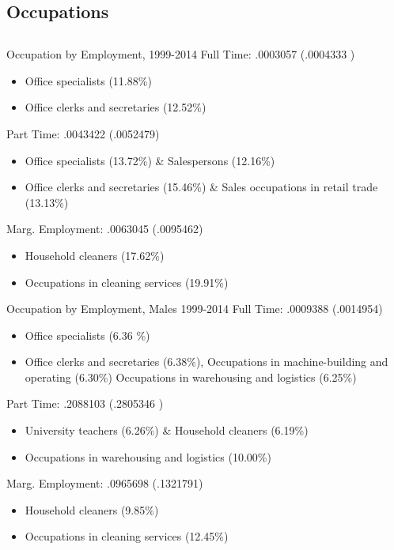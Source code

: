 \documentclass[hyperref={bookmarks=false}]{beamer}
\begin{document}
\begin{appendix}
\section{Occupations}
\subsection{}

\begin{frame}
\label{OCCUP}
\end{frame}

\begin{frame}{Occupation by Employment, 1999-2014}
Full Time: .0003057 (.0004333 )
\begin{itemize}
\item Office specialists (11.88\%)
\item Office clerks and secretaries (12.52\%)
\end{itemize}
\vfill
Part Time: .0043422 (.0052479)
\begin{itemize}
\item Office specialists (13.72\%) \& Salespersons (12.16\%)
\item Office clerks and secretaries (15.46\%) \&  Sales occupations in retail trade (13.13\%)
\end{itemize}
\vfill
Marg. Employment: .0063045 (.0095462)
\begin{itemize}
\item Household cleaners (17.62\%)
\item Occupations in cleaning services (19.91\%)
\end{itemize}
\end{frame}

\begin{frame}{Occupation by Employment, Males 1999-2014}
Full Time: .0009388 (.0014954)
\begin{itemize}
\item Office specialists (6.36 \%)
\item Office clerks and secretaries (6.38\%), Occupations in machine-building and operating (6.30\%) Occupations in warehousing and logistics (6.25\%) 
\end{itemize}
\vfill
Part Time: .2088103 (.2805346 )
\begin{itemize}
\item University teachers (6.26\%) \&  Household cleaners (6.19\%)
\item Occupations in warehousing and logistics (10.00\%)
\end{itemize}
\vfill
Marg. Employment: .0965698 (.1321791)
\begin{itemize}
\item Household cleaners (9.85\%)
\item Occupations in cleaning services (12.45\%)
\end{itemize}
\end{frame}


\end{appendix}
\end{document}
